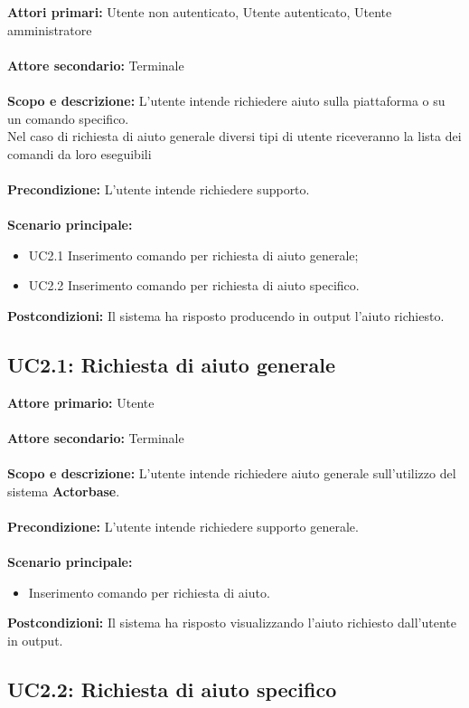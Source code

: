 \documentclass{scalatekids-article}
\begin{document}
\textbf{Attori primari:} Utente non autenticato, Utente autenticato, Utente amministratore\\ \\
\textbf{Attore secondario:} Terminale\\ \\
\textbf{Scopo e descrizione:} L'utente intende richiedere aiuto sulla piattaforma o su un comando specifico.\\Nel caso di richiesta di aiuto generale diversi tipi di utente riceveranno la lista dei comandi da loro eseguibili\\ \\
\textbf{Precondizione:} L'utente intende richiedere supporto.\\ \\
\textbf{Scenario principale:}
\begin{itemize}
\item UC2.1 Inserimento comando per richiesta di aiuto generale;
\item UC2.2 Inserimento comando per richiesta di aiuto specifico.
\end{itemize}
\textbf{Postcondizioni:} Il sistema ha risposto producendo in output l'aiuto richiesto.

\subsection{UC2.1: Richiesta di aiuto generale}

\textbf{Attore primario:} Utente\\ \\
\textbf{Attore secondario:} Terminale\\ \\
\textbf{Scopo e descrizione:} L'utente intende richiedere aiuto generale sull'utilizzo del sistema \textbf{Actorbase}.\\ \\
\textbf{Precondizione:} L'utente intende richiedere supporto generale.\\ \\
\textbf{Scenario principale:}
\begin{itemize}
\item Inserimento comando per richiesta di aiuto.
\end{itemize}
\textbf{Postcondizioni:} Il sistema ha risposto visualizzando l'aiuto richiesto dall'utente in output.

\subsection{UC2.2: Richiesta di aiuto specifico}
\end{document}
